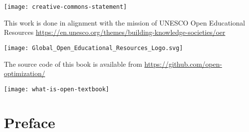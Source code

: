 \documentclass[../open-optimization/open-optimization.tex]{subfiles}
\begin{document}

\maketitle
\texttt{[image: creative-commons-statement]}


This work is done in alignment with the mission of UNESCO Open Educational Resources \url{https://en.unesco.org/themes/building-knowledge-societies/oer}
\begin{center}
\texttt{[image: Global\_Open\_Educational\_Resources\_Logo.svg]}\footnotemark
\end{center}

The source code of this book is available from
\url{https://github.com/open-optimization/}

\newpage

\texttt{[image: what-is-open-textbook]}\footnotemark
{}

\newpage

\section*{Preface}


\end{document}
